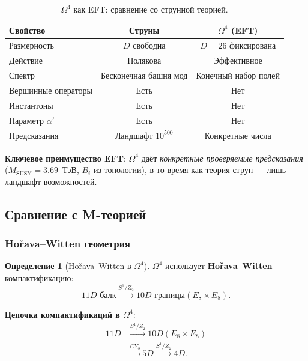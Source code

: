\documentclass[11pt,a4paper]{article}
\newcommand{\CY}{\ensuremath{CY_3}}
\newcommand{\Om}{\ensuremath{\Omega^4}}
\theoremstyle{definition}
\newtheorem{definition}[theorem]{Определение}
\begin{document}
\begin{table}[ht]
\centering
\caption{\texorpdfstring{$\Om$}{} как EFT: сравнение со струнной теорией.}
\label{tab:string-eft-vs}
\begin{tabular}{lcc}
\toprule
Свойство & Струны & $\Om$ (EFT) \\
\midrule
Размерность & $D$ свободна & $D = 26$ фиксирована \\
Действие & Полякова & Эффективное \\
Спектр & Бесконечная башня мод & Конечный набор полей \\
Вершинные операторы & Есть & Нет \\
Инстантоны & Есть & Нет \\
Параметр $\alpha'$ & Есть & Нет \\
Предсказания & Ландшафт $10^{500}$ & Конкретные числа \\
\bottomrule
\end{tabular}
\end{table}

\medskip\noindent
\textbf{Ключевое преимущество EFT}: $\Om$ даёт \emph{конкретные
проверяемые предсказания} ($M_{\text{SUSY}} = 3.69$~ТэВ,
$B_i$ из топологии), в то время как теория струн ---
лишь ландшафт возможностей.

\subsection{Сравнение с M-теорией}
\label{subsec:string-mtheory}

\subsubsection{Hořava--Witten геометрия}

\begin{definition}[Hořava--Witten в $\Om$]
\label{def:string-horava-witten}
$\Om$ использует \textbf{Hořava--Witten} компактификацию:
\begin{equation}
    11D \text{ балк} \xrightarrow{S^1/Z_2} 10D \text{ границы}
    (E_8 \times E_8).
    \label{eq:string-horava-witten}
\end{equation}
\end{definition}

\medskip\noindent
\textbf{Цепочка компактификаций в $\Om$}:
\begin{equation}
    \boxed{
    \begin{aligned}
    11D &\xrightarrow{S^1/Z_2} 10D (E_8 \times E_8) \\
        &\xrightarrow{\CY} 5D \xrightarrow{S^1/Z_2} 4D.
    \end{aligned}}
    \label{eq:string-compact-chain}
\end{equation}
\end{document}
